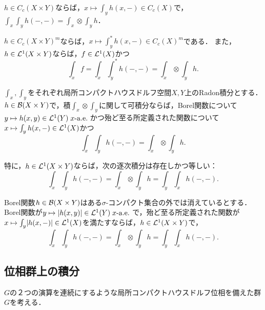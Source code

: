 \documentclass[uplatex,dvipdfmx]{jsreport}
\begin{document}
\begin{lemma}
    $h\in C_c(X\times Y)$ならば，$x\mapsto\int_yh(x,-)\in C_c(X)$で，$\int_x\int_yh(-,-)=\int_x\otimes\int_yh$．
\end{lemma}

\begin{lemma}
    $h\in C_c(X\times Y)^m$ならば，$x\mapsto\int_y^*h(x,-)\in C_c(X)^m$である．
    また，$h\in\mathcal{L}^1(X\times Y)$ならば，$f\in\mathcal{L}^1(X)$かつ
    \[\int_xf=\int_x\int_y^*h(-,-)=\int_x\otimes\int_yh.\]
\end{lemma}

\begin{theorem}[Fubini]
    $\int_x,\int_y$をそれぞれ局所コンパクトハウスドルフ空間$X,Y$上のRadon積分とする．
    $h\in\mathcal{B}(X\times Y)$で，積$\int_x\otimes\int_y$に関して可積分ならば，Borel関数について$y\mapsto h(x,y)\in\mathcal{L}^1(Y)\;x\text{-}\mathrm{a.e.}\;$かつ殆ど至る所定義された関数について$x\mapsto\int_yh(x,-)\in\mathcal{L}^1(X)$かつ
    \[\int_x\int_yh(-,-)=\int_x\otimes\int_yh.\]
\end{theorem}
\begin{remarks}
    特に，$h\in\mathcal{L}^1(X\times Y)$ならば，次の逐次積分は存在しかつ等しい：\[\int_x\int_yh(-,-)=\int_x\otimes\int_yh=\int_y\int_xh(-,-).\]
\end{remarks}

\begin{corollary}[Tonelli]
    Borel関数$h\in\mathcal{B}(X\times Y)$はある$\sigma$-コンパクト集合の外では消えているとする．
    Borel関数が$y\mapsto\lvert h(x,y)\rvert\in\mathcal{L}^1(Y)\;x\text{-}\mathrm{a.e.}\;$で，殆ど至る所定義された関数が$x\mapsto\int_y\lvert h(x,-)\rvert\in\mathcal{L}^1(X)$を満たすならば，$h\in\mathcal{L}^1(X\times Y)$で，
    \[\int_x\int_yh(-,-)=\int_x\otimes\int_yh=\int_y\int_xh(-,-).\]
\end{corollary}

\subsection{位相群上の積分}

\begin{tcolorbox}[colframe=ForestGreen, colback=ForestGreen!10!white,breakable,colbacktitle=ForestGreen!40!white,coltitle=black,fonttitle=\bfseries\sffamily,
title=]
    $G$の２つの演算を連続にするような局所コンパクトハウスドルフ位相を備えた群$G$を考える．
\end{tcolorbox}
\end{document}
